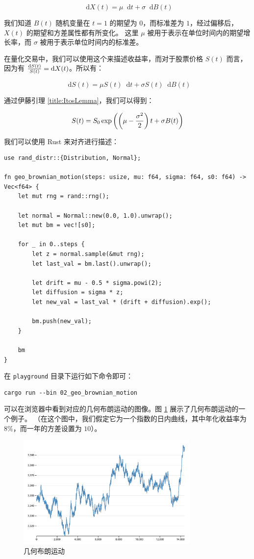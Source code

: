 \documentclass[utf8,a4paper,nofonts,9pt]{ctexbook}
\def\dif{\mathop{}\!\mathrm{d}}
\begin{document}
$$
\dif{X(t)} = \mu \dif{t} + \sigma \dif{B(t)}
$$

我们知道 $B(t)$ 随机变量在 $t = 1$ 的期望为 $0$，而标准差为 $1$，经过偏移后，$X(t)$ 的期望和方差属性都有所变化。
这里 $\mu$ 被用于表示在单位时间内的期望增长率，而 $\sigma$ 被用于表示单位时间内的标准差。

在量化交易中，我们可以使用这个来描述收益率，而对于股票价格 $S(t)$ 而言，因为有 ${\dif{S(t)} \over S(t)} = \dif{X(t)}$。所以有：

$$
\dif{S(t)} = \mu S(t) \dif{t} + \sigma S(t) \dif{B(t)}
$$

通过伊藤引理 \ref{title:ItosLemma}，我们可以得到：

$$
S(t) = S_0 \exp\left(\left(\mu - {\sigma^2 \over 2}\right)t + \sigma B(t)\right)
$$

我们可以使用 Rust 来对齐进行描述：

\begin{lstlisting}
use rand_distr::{Distribution, Normal};

fn geo_brownian_motion(steps: usize, mu: f64, sigma: f64, s0: f64) -> Vec<f64> {
    let mut rng = rand::rng();

    let normal = Normal::new(0.0, 1.0).unwrap();
    let mut bm = vec![s0];

    for _ in 0..steps {
        let z = normal.sample(&mut rng);
        let last_val = bm.last().unwrap();

        let drift = mu - 0.5 * sigma.powi(2);
        let diffusion = sigma * z;
        let new_val = last_val * (drift + diffusion).exp();

        bm.push(new_val);
    }

    bm
}
\end{lstlisting}

在 \verb|playground| 目录下运行如下命令即可：

\begin{lstlisting}
cargo run --bin 02_geo_brownian_motion
\end{lstlisting}

可以在浏览器中看到对应的几何布朗运动的图像。图 \ref{fig:geoBrownianMotion} 展示了几何布朗运动的一个例子。
（在这个图中，我们假定它为一个指数的日内曲线，其中年化收益率为 $8\%$，而一年的方差设置为 $10$）。

\begin{figure}[h]
    \centering
    \includegraphics[width=0.8\textwidth]{src/static/01_geo_brownian_motion.png}
    \caption{几何布朗运动}
    \label{fig:geoBrownianMotion}
\end{figure}
\end{document}
